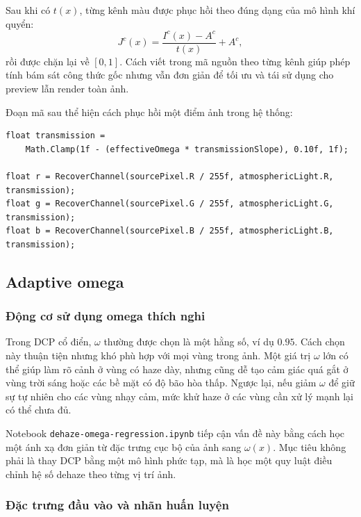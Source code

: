 Sau khi có \(t(x)\), từng kênh màu được phục hồi theo đúng dạng của mô hình khí quyển:
\[
J^c(x)=\frac{I^c(x)-A^c}{t(x)} + A^c,
\]
rồi được chặn lại về \([0,1]\). Cách viết trong mã nguồn theo từng kênh giúp phép tính bám sát công thức gốc nhưng vẫn đơn giản để tối ưu và tái sử dụng cho preview lẫn render toàn ảnh.

Đoạn mã sau thể hiện cách phục hồi một điểm ảnh trong hệ thống:

\begin{lstlisting}[style=csharpblock,caption={Trích đoạn RecoverPixel và cách Strength đi vào recovery}]
float transmission =
    Math.Clamp(1f - (effectiveOmega * transmissionSlope), 0.10f, 1f);

float r = RecoverChannel(sourcePixel.R / 255f, atmosphericLight.R, transmission);
float g = RecoverChannel(sourcePixel.G / 255f, atmosphericLight.G, transmission);
float b = RecoverChannel(sourcePixel.B / 255f, atmosphericLight.B, transmission);
\end{lstlisting}

\subsection{Adaptive omega}

\subsubsection{Động cơ sử dụng omega thích nghi}

Trong DCP cổ điển, \(\omega\) thường được chọn là một hằng số, ví dụ \(0.95\). Cách chọn này thuận tiện nhưng khó phù hợp với mọi vùng trong ảnh. Một giá trị \(\omega\) lớn có thể giúp làm rõ cảnh ở vùng có haze dày, nhưng cũng dễ tạo cảm giác quá gắt ở vùng trời sáng hoặc các bề mặt có độ bão hòa thấp. Ngược lại, nếu giảm \(\omega\) để giữ sự tự nhiên cho các vùng nhạy cảm, mức khử haze ở các vùng cần xử lý mạnh lại có thể chưa đủ.

Notebook \texttt{dehaze-omega-regression.ipynb} tiếp cận vấn đề này bằng cách học một ánh xạ đơn giản từ đặc trưng cục bộ của ảnh sang \(\omega(x)\). Mục tiêu không phải là thay DCP bằng một mô hình phức tạp, mà là học một quy luật điều chỉnh hệ số dehaze theo từng vị trí ảnh.

\subsubsection{Đặc trưng đầu vào và nhãn huấn luyện}

